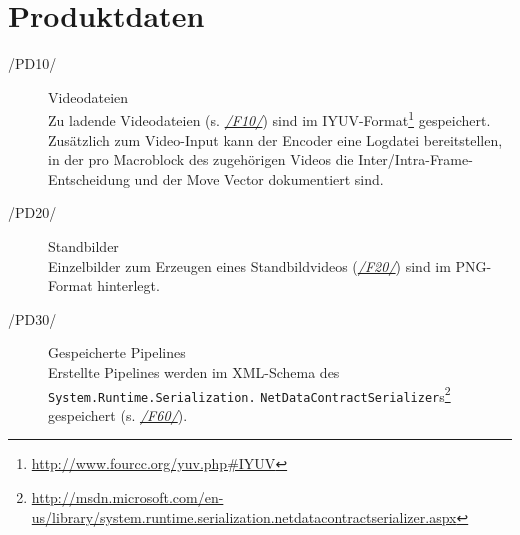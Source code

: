 \section{Produktdaten}
\label{sec:produktdaten}

\begin{description}
	\item[/PD10/] Videodateien \\
        Zu ladende Videodateien (s. \hyperref[F10]{\emph{/F10/}}) sind im IYUV-Format\footnote{\url{http://www.fourcc.org/yuv.php\#IYUV}} gespeichert. Zusätzlich zum Video-Input kann der Encoder eine Logdatei bereitstellen, in der pro Macroblock des zugehörigen Videos die Inter/Intra-Frame-Entscheidung und der Move Vector dokumentiert sind.
	\item[/PD20/] Standbilder \\
        Einzelbilder zum Erzeugen eines Standbildvideos (\hyperref[F20]{\emph{/F20/}}) sind im PNG-Format hinterlegt.
	\item[/PD30/] Gespeicherte Pipelines \\
        Erstellte Pipelines werden im XML-Schema des \texttt{System.Runtime.Serialization.} \texttt{NetDataContractSerializer}s\footnote{\url{http://msdn.microsoft.com/en-us/library/system.runtime.serialization.netdatacontractserializer.aspx}} gespeichert (s. \hyperref[F60]{\emph{/F60/}}).
\end{description}
